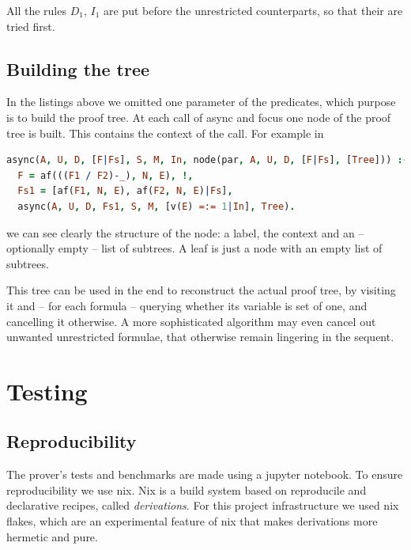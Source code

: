 \documentclass[a4paper, 12pt, tesi, english]{report}
\begin{document}
All the rules $D_1$, $I_1$ are put before the unrestricted counterparts, so that their are tried first.

\section{Building the tree}
In the listings above we omitted one parameter of the predicates, which purpose is to build the proof tree.
At each call of async and focus one node of the proof tree is built.
This contains the context of the call.
For example in
\begin{lstlisting}[language=prolog]
async(A, U, D, [F|Fs], S, M, In, node(par, A, U, D, [F|Fs], [Tree])) :- 
  F = af(((F1 / F2)-_), N, E), !,
  Fs1 = [af(F1, N, E), af(F2, N, E)|Fs],
  async(A, U, D, Fs1, S, M, [v(E) =:= 1|In], Tree).
\end{lstlisting}
we can see clearly the structure of the node: a label, the context and an -- optionally empty -- list of subtrees.
A leaf is just a node with an empty list of subtrees.

This tree can be used in the end to reconstruct the actual proof tree, by visiting it and -- for each formula -- querying whether its variable is set of one, and cancelling it otherwise.
A more sophisticated algorithm may even cancel out unwanted unrestricted formulae, that otherwise remain lingering in the sequent.

\chapter{Testing}
\section{Reproducibility}
The prover's tests and benchmarks are made using a jupyter notebook.
To ensure reproducibility we use nix.
Nix is a build system based on reproducile and declarative recipes, called \textit{derivations}.
For this project infrastructure we used nix flakes, which are an experimental feature of nix that makes derivations more hermetic and pure.
\end{document}
